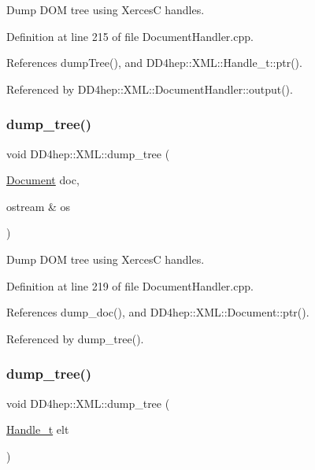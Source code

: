 Dump D\+OM tree using XercesC handles. 



Definition at line 215 of file Document\+Handler.\+cpp.



References dump\+Tree(), and D\+D4hep\+::\+X\+M\+L\+::\+Handle\+\_\+t\+::ptr().



Referenced by D\+D4hep\+::\+X\+M\+L\+::\+Document\+Handler\+::output().

\hypertarget{namespace_d_d4hep_1_1_x_m_l_a890f94a51fe7c0a877ec482ec35caaf9}{}\label{namespace_d_d4hep_1_1_x_m_l_a890f94a51fe7c0a877ec482ec35caaf9} 
\subsubsection{\texorpdfstring{dump\+\_\+tree()}{dump\_tree()}\hspace{0.1cm}{\footnotesize\ttfamily [2/6]}}
{\footnotesize\ttfamily void D\+D4hep\+::\+X\+M\+L\+::dump\+\_\+tree (\begin{DoxyParamCaption}\item[{\hyperlink{class_d_d4hep_1_1_x_m_l_1_1_document}{Document}}]{doc,  }\item[{ostream \&}]{os }\end{DoxyParamCaption})}



Dump D\+OM tree using XercesC handles. 



Definition at line 219 of file Document\+Handler.\+cpp.



References dump\+\_\+doc(), and D\+D4hep\+::\+X\+M\+L\+::\+Document\+::ptr().



Referenced by dump\+\_\+tree().

\hypertarget{namespace_d_d4hep_1_1_x_m_l_ab1004ab7c53f769743d8bd09c7891fd7}{}\label{namespace_d_d4hep_1_1_x_m_l_ab1004ab7c53f769743d8bd09c7891fd7} 
\subsubsection{\texorpdfstring{dump\+\_\+tree()}{dump\_tree()}\hspace{0.1cm}{\footnotesize\ttfamily [3/6]}}
{\footnotesize\ttfamily void D\+D4hep\+::\+X\+M\+L\+::dump\+\_\+tree (\begin{DoxyParamCaption}\item[{\hyperlink{class_d_d4hep_1_1_x_m_l_1_1_handle__t}{Handle\+\_\+t}}]{elt }\end{DoxyParamCaption})}




